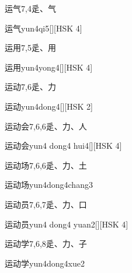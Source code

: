 \begin{entry}{运气}{7,4}{⾡、⽓}
  \begin{phonetics}{运气}{yun4qi5}[][HSK 4]
  \end{phonetics}
\end{entry}

\begin{entry}{运用}{7,5}{⾡、⽤}
  \begin{phonetics}{运用}{yun4yong4}[][HSK 4]
  \end{phonetics}
\end{entry}

\begin{entry}{运动}{7,6}{⾡、⼒}
  \begin{phonetics}{运动}{yun4dong4}[][HSK 2]
  \end{phonetics}
\end{entry}

\begin{entry}{运动会}{7,6,6}{⾡、⼒、⼈}
  \begin{phonetics}{运动会}{yun4 dong4 hui4}[][HSK 4]
  \end{phonetics}
\end{entry}

\begin{entry}{运动场}{7,6,6}{⾡、⼒、⼟}
  \begin{phonetics}{运动场}{yun4dong4chang3}
  \end{phonetics}
\end{entry}

\begin{entry}{运动员}{7,6,7}{⾡、⼒、⼝}
  \begin{phonetics}{运动员}{yun4 dong4 yuan2}[][HSK 4]
  \end{phonetics}
\end{entry}

\begin{entry}{运动学}{7,6,8}{⾡、⼒、⼦}
  \begin{phonetics}{运动学}{yun4dong4xue2}
  \end{phonetics}
\end{entry}

